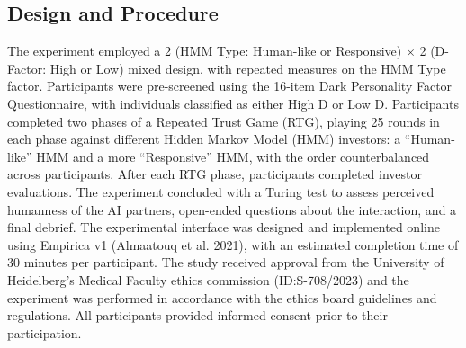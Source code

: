 \documentclass[
]{article}
\begin{document}
\subsection{Design and Procedure}\label{design-and-procedure}

The experiment employed a 2 (HMM Type: Human-like or Responsive) × 2 (D-Factor: High or Low) mixed design, with repeated measures on the HMM Type factor. Participants were pre-screened using the 16-item Dark Personality Factor Questionnaire, with individuals classified as either High D or Low D. Participants completed two phases of a Repeated Trust Game (RTG), playing 25 rounds in each phase against different Hidden Markov Model (HMM) investors: a ``Human-like'' HMM and a more ``Responsive'' HMM, with the order counterbalanced across participants. After each RTG phase, participants completed investor evaluations. The experiment concluded with a Turing test to assess perceived humanness of the AI partners, open-ended questions about the interaction, and a final debrief. The experimental interface was designed and implemented online using Empirica v1 (Almaatouq et al. 2021), with an estimated completion time of 30 minutes per participant. The study received approval from the University of Heidelberg's Medical Faculty ethics commission (ID:S-708/2023) and the experiment was performed in accordance with the ethics board guidelines and regulations. All participants provided informed consent prior to their participation.
\end{document}
